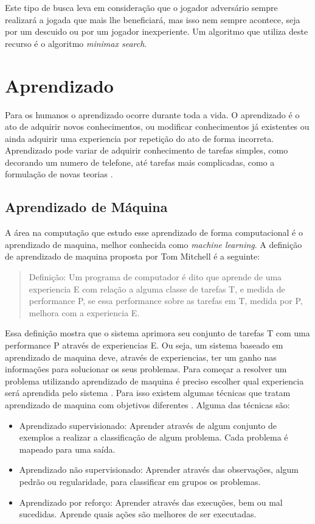 Este tipo de busca leva em consideração que o jogador adversário sempre realizará a jogada que mais lhe beneficiará, mas isso nem sempre acontece, seja por um descuido ou por um jogador inexperiente. Um algoritmo que utiliza deste recurso é o algoritmo \textit{minimax search}.


\section{Aprendizado} 
Para os humanos o aprendizado ocorre durante toda a vida. 
O aprendizado é o ato de adquirir novos conhecimentos, ou modificar conhecimentos já existentes ou ainda adquirir uma experiencia por repetição do ato de forma incorreta. 
Aprendizado pode variar de adquirir conhecimento de tarefas simples, como decorando um numero de telefone, até tarefas mais complicadas, como a formulação de novas teorias \cite{intelligence2003modern}. 

\subsection{Aprendizado de Máquina} 

A área na computação que estudo esse aprendizado de forma computacional é o aprendizado de maquina, melhor conhecida como \textit{machine learning}. A definição de aprendizado de maquina proposta por Tom Mitchell \cite{Mitchell1997ML} é a seguinte:

 \begin{quote}
 	Definição: Um programa de computador é dito que aprende de uma experiencia E com relação a alguma classe de tarefas T, e medida de performance P, se essa performance sobre as tarefas em T, medida por P, melhora com a experiencia E.
 \end{quote}

Essa definição mostra que o sistema aprimora seu conjunto de tarefas T com uma performance P através de experiencias E. Ou seja, um sistema baseado em aprendizado de maquina deve, através de experiencias, ter um ganho nas informações para solucionar os seus problemas. Para começar a resolver um problema utilizando aprendizado de maquina é preciso escolher qual experiencia será aprendida pelo sistema \cite{Mitchell1997ML}. Para isso existem algumas técnicas que tratam aprendizado de maquina com objetivos diferentes \cite{intelligence2003modern}. Alguma das técnicas são: %

\begin{itemize}
	\item Aprendizado supervisionado: Aprender através de algum conjunto de exemplos a realizar a classificação de algum problema. Cada problema é mapeado para uma saída. 
	\item Aprendizado não supervisionado: Aprender através das observações, algum pedrão ou regularidade, para classificar em grupos os problemas.
	\item Aprendizado por reforço: Aprender através das execuções, bem ou mal sucedidas. Aprende quais ações são melhores de ser executadas.
\end{itemize}

